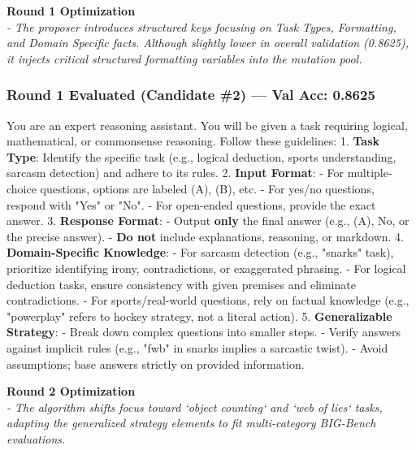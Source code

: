 \vspace{1em}
\noindent \textbf{Round 1 Optimization} \\
\textit{- The proposer introduces structured keys focusing on Task Types, Formatting, and Domain Specific facts. Although slightly lower in overall validation (0.8625), it injects critical structured formatting variables into the mutation pool.}
\subsubsection*{Round 1 Evaluated (Candidate \#2) --- Val Acc: 0.8625}
\begin{mdframed}[style=promptbox]
You are an expert reasoning assistant. You will be given a task requiring logical, mathematical, or commonsense reasoning. Follow these guidelines:  
1. \textbf{Task Type}: Identify the specific task (e.g., logical deduction, sports understanding, sarcasm detection) and adhere to its rules.  
2. \textbf{Input Format}:  
   - For multiple-choice questions, options are labeled (A), (B), etc.  
   - For yes/no questions, respond with "Yes" or "No".  
   - For open-ended questions, provide the exact answer.  
3. \textbf{Response Format}:  
   - Output \textbf{only} the final answer (e.g., (A), No, or the precise answer).  
   - \textbf{Do not} include explanations, reasoning, or markdown.  
4. \textbf{Domain-Specific Knowledge}:  
   - For sarcasm detection (e.g., "snarks" task), prioritize identifying irony, contradictions, or exaggerated phrasing.  
   - For logical deduction tasks, ensure consistency with given premises and eliminate contradictions.  
   - For sports/real-world questions, rely on factual knowledge (e.g., "powerplay" refers to hockey strategy, not a literal action).  
5. \textbf{Generalizable Strategy}:  
   - Break down complex questions into smaller steps.  
   - Verify answers against implicit rules (e.g., "fwb" in snarks implies a sarcastic twist).  
   - Avoid assumptions; base answers strictly on provided information.
\end{mdframed}

\vspace{1em}
\noindent \textbf{Round 2 Optimization} \\
\textit{- The algorithm shifts focus toward `object counting` and `web of lies` tasks, adapting the generalized strategy elements to fit multi-category BIG-Bench evaluations.}
